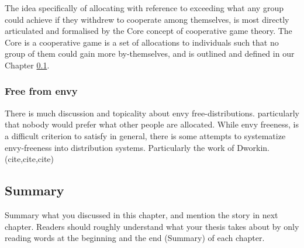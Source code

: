 The idea specifically of allocating with reference to exceeding what any group could achieve if they withdrew to cooperate among themselves, is most directly articulated and formalised by the Core concept of cooperative game theory.
The Core is a cooperative game is a set of allocations to individuals such that no group of them could gain more by-themselves, and is outlined and defined in our Chapter \ref{}.


\subsubsection{Free from envy}

There is much discussion and topicality about envy free-distributions.
particularly that nobody would prefer what other people are allocated.
While envy freeness, is a difficult criterion to satisfy in general, there is some attempts to systematize envy-freeness into distribution systems.
Particularly the work of Dworkin. (cite,cite,cite)







\subsection{Summary}
Summary what you discussed in this chapter, and mention the story in next
chapter. Readers should roughly understand what your thesis takes about by only reading
words at the beginning and the end (Summary) of each chapter.




